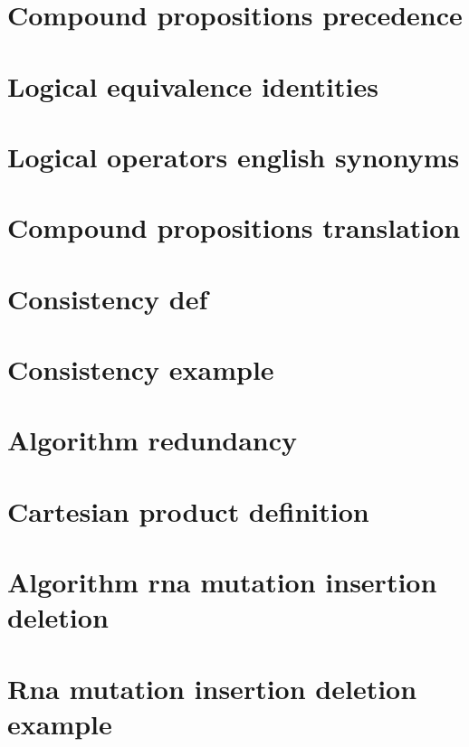 \section*{Compound propositions precedence}

\vfill
\section*{Logical equivalence identities}

\vfill
\section*{Logical operators english synonyms}

\vfill
\section*{Compound propositions translation}

\vfill
\section*{Consistency def}

\vfill
\section*{Consistency example}

\vfill
\section*{Algorithm redundancy}

\vfill
\section*{Cartesian product definition}

\vfill
\section*{Algorithm rna mutation insertion deletion}

\vfill
\section*{Rna mutation insertion deletion example}

\vfill
